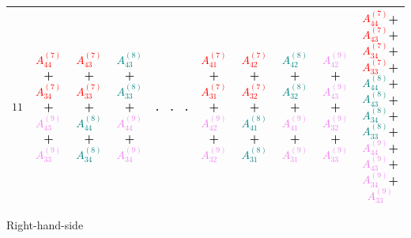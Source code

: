 \documentclass[times,namecite]{goose-article}
\begin{document}
\begin{landscape}
{\begin{tabular}{|c|ccccccccc|cc|}
$11 $& \textcolor{red}{$A_{44}^{(7)}$}+\textcolor{red}{$A_{34}^{(7)}$}+\textcolor{violet}{$A_{43}^{(9)}$}+\textcolor{violet}{$A_{33}^{(9)}$} & \textcolor{red}{$A_{43}^{(7)}$}+\textcolor{red}{$A_{33}^{(7)}$}+\textcolor{teal}{$A_{44}^{(8)}$}+\textcolor{teal}{$A_{34}^{(8)}$} & \textcolor{teal}{$A_{43}^{(8)}$}+\textcolor{teal}{$A_{33}^{(8)}$}+\textcolor{violet}{$A_{44}^{(9)}$}+\textcolor{violet}{$A_{34}^{(9)}$} & . & . & . & \textcolor{red}{$A_{41}^{(7)}$}+\textcolor{red}{$A_{31}^{(7)}$}+\textcolor{violet}{$A_{42}^{(9)}$}+\textcolor{violet}{$A_{32}^{(9)}$} & \textcolor{red}{$A_{42}^{(7)}$}+\textcolor{red}{$A_{32}^{(7)}$}+\textcolor{teal}{$A_{41}^{(8)}$}+\textcolor{teal}{$A_{31}^{(8)}$} & \textcolor{teal}{$A_{42}^{(8)}$}+\textcolor{teal}{$A_{32}^{(8)}$}+\textcolor{violet}{$A_{41}^{(9)}$}+\textcolor{violet}{$A_{31}^{(9)}$} & \textcolor{violet}{$A_{42}^{(9)}$}+\textcolor{violet}{$A_{43}^{(9)}$}+\textcolor{violet}{$A_{32}^{(9)}$}+\textcolor{violet}{$A_{33}^{(9)}$} & \textcolor{red}{$A_{44}^{(7)}$}+\textcolor{red}{$A_{43}^{(7)}$}+\textcolor{red}{$A_{34}^{(7)}$}+\textcolor{red}{$A_{33}^{(7)}$}+\textcolor{teal}{$A_{44}^{(8)}$}+\textcolor{teal}{$A_{43}^{(8)}$}+\textcolor{teal}{$A_{34}^{(8)}$}+\textcolor{teal}{$A_{33}^{(8)}$}+\textcolor{violet}{$A_{44}^{(9)}$}+\textcolor{violet}{$A_{43}^{(9)}$}+\textcolor{violet}{$A_{34}^{(9)}$}+\textcolor{violet}{$A_{33}^{(9)}$} \\ \hline
\end{tabular}
}

\begin{center}
Right-hand-side
\end{center}


\end{landscape}
\end{document}
